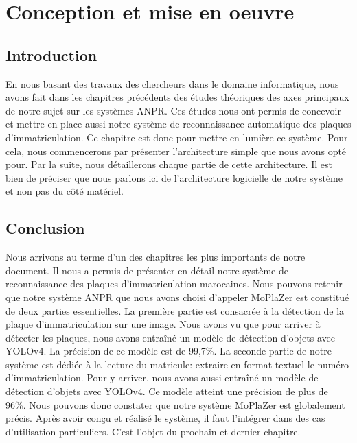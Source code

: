 \chapter{\textbf{Conception et mise en oeuvre}}
    \section{Introduction}
    En nous basant des travaux des chercheurs dans le domaine informatique, nous avons fait dans les chapitres précédents des études théoriques des axes principaux de notre sujet sur les systèmes ANPR. Ces études nous ont permis de concevoir et mettre en place aussi notre système de reconnaissance automatique des plaques d'immatriculation. Ce chapitre est donc pour mettre en lumière ce système. Pour cela, nous commencerons par présenter l'architecture simple que nous avons opté pour. Par la suite, nous détaillerons chaque partie de cette architecture. Il est bien de préciser que nous parlons ici de l'architecture logicielle de notre système et non pas du côté matériel.
    
    
    
    

    \section{Conclusion}
    Nous arrivons au terme d’un des chapitres les plus importants de notre document. Il  nous a permis de présenter en détail notre système de reconnaissance des plaques d’immatriculation marocaines. Nous pouvons retenir que notre système ANPR que nous avons choisi d’appeler MoPlaZer est constitué de deux parties essentielles. La première partie est consacrée à la détection de la plaque d’immatriculation sur une image. Nous avons vu que pour arriver à détecter les plaques, nous avons entraîné un modèle de détection d’objets avec YOLOv4. La précision de ce modèle est de 99,7\%. La seconde partie de notre système est dédiée à la lecture du matricule: extraire en format textuel le numéro d’immatriculation. Pour y arriver, nous avons aussi entraîné un modèle de détection d’objets avec YOLOv4. Ce modèle atteint une précision de plus de 96\%. Nous pouvons donc constater que notre système MoPlaZer est globalement précis. Après avoir conçu et réalisé le système, il faut l’intégrer dans des cas d’utilisation particuliers. C’est l’objet du prochain et dernier chapitre.